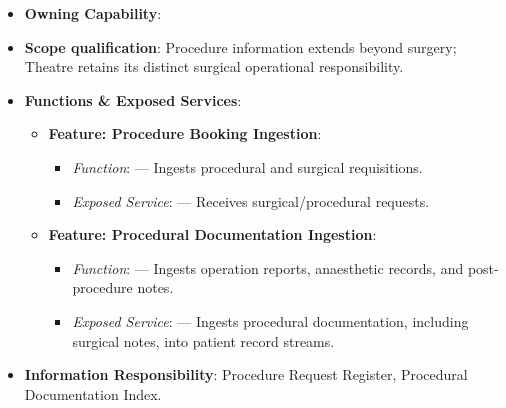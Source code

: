 \begin{itemize}

\item
\textbf{Owning Capability}: \texttt{}



\item
\textbf{Scope qualification}: Procedure information extends beyond surgery; Theatre retains its distinct surgical operational responsibility.



\item
\textbf{Functions \& Exposed Services}:


\begin{itemize}

\item
\textbf{Feature: Procedure Booking Ingestion}:


\begin{itemize}

\item
\emph{Function}: \texttt{} — Ingests procedural and surgical requisitions.



\item
\emph{Exposed Service}: \texttt{} — Receives surgical/\allowbreak{}procedural requests.



\end{itemize}


\item
\textbf{Feature: Procedural Documentation Ingestion}:


\begin{itemize}

\item
\emph{Function}: \texttt{} — Ingests operation reports, anaesthetic records, and post-procedure notes.



\item
\emph{Exposed Service}: \texttt{} — Ingests procedural documentation, including surgical notes, into patient record streams.



\end{itemize}


\end{itemize}


\item
\textbf{Information Responsibility}: Procedure Request Register, Procedural Documentation Index.



\end{itemize}
\label{rad:sa:160}

